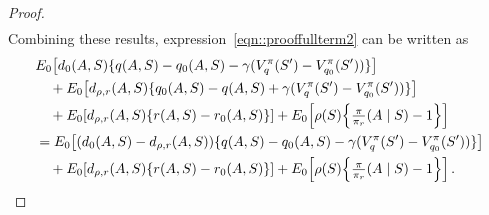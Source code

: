 \documentclass[11pt]{article}
\theoremstyle{plain}
\begin{document}
\begin{proof}
\begin{align*}
\end{align*}
Combining these results, expression~\eqref{eqn::prooffullterm2} can be written as
\begin{equation}
\label{eqn::prooffullterm3}
\begin{aligned}
& E_0\!\left[d_0(A,S)\{q(A,S) - q_0(A,S) - \gamma (V_q^\pi(S') - V_{q_0}^\pi(S'))\}\right] \\
&\quad + E_0\!\left[d_{\rho,r}(A,S)\{q_0(A,S) - q(A,S) + \gamma (V_q^\pi(S') - V_{q_0}^\pi(S'))\}\right] \\
&\quad + E_0\!\left[d_{\rho,r}(A,S)\{r(A,S) - r_0(A,S)\}\right] 
   + E_0\!\left[\rho(S)\Bigl\{\tfrac{\pi}{\pi_r}(A \mid S) - 1\Bigr\}\right] \\
&= E_0\!\left[(d_0(A,S) - d_{\rho,r}(A,S))\{q(A,S) - q_0(A,S) - \gamma (V_q^\pi(S') - V_{q_0}^\pi(S'))\}\right] \\
&\quad + E_0\!\left[d_{\rho,r}(A,S)\{r(A,S) - r_0(A,S)\}\right] 
   + E_0\!\left[\rho(S)\Bigl\{\tfrac{\pi}{\pi_r}(A \mid S) - 1\Bigr\}\right].
\end{aligned}
\end{equation}


\end{proof}
\end{document}
